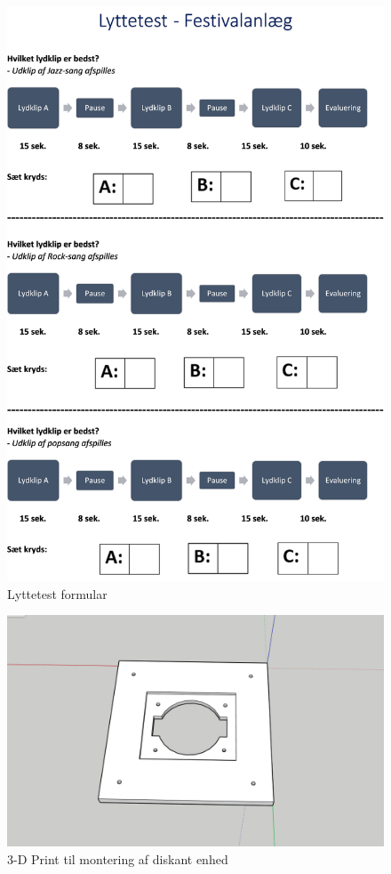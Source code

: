 \begin{figure}[H] 
	\center
	\includegraphics[width=0.9\linewidth]{figur/Lyttetest}\quad
	\caption{Lyttetest formular}
	\label{fig:Lyttetest}
\end{figure}

\begin{figure}[H] 
	\center
	\includegraphics[width=0.9\linewidth]{figur/Sketchup}\quad
	\caption{3-D Print til montering af diskant enhed}
	\label{fig:Sketchup}
\end{figure}